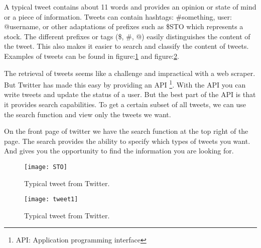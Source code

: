 A typical tweet contains about 11 words and provides an opinion or state of
mind or a piece of information. Tweets can contain hashtags: #something, user:
@username, or other adaptations of prefixes such as \$STO which represents a
stock. The different prefixes or tags (\$, \#, @) easily distinguishes the
content of the tweet. This also makes it easier to search and classify the
content of tweets. Examples of tweets can be found in figure:\ref{fig:sto} and
figure:\ref{fig:tweet1}.

The retrieval of tweets seems like a challenge and impractical with
a web scraper. But Twitter has made this easy by providing an API
\footnote{API: Application programming interface}. With the API you can write
tweets and update the status of a user. But the best part of the API is that it
provides search capabilities. To get a certain subset of all tweets, we can use
the search function and view only the tweets we want. 

On the front page of twitter we have the search function at the top right of
the page. The search provides the ability to specify which types of tweets you
want. And gives you the opportunity to find the information you are looking for. 

\begin{figure}[htb]
    \centering
    \texttt{[image: STO]} 
    \caption{Typical tweet from Twitter.}
    \label{fig:sto}
\end{figure}


\begin{figure}[htb]
    \centering
    \texttt{[image: tweet1]} 
    \caption{Typical tweet from Twitter.}
    \label{fig:tweet1}
\end{figure}

%

